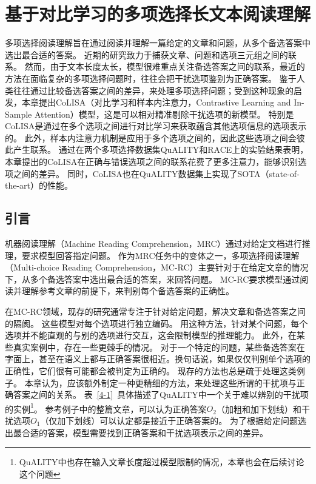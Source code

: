 \chapter{基于对比学习的多项选择长文本阅读理解}
多项选择阅读理解旨在通过阅读并理解一篇给定的文章和问题，从多个备选答案中选出最合适的答案。
近期的研究致力于捕获文章、问题和选项三元组之间的联系。
然而，由于文本长度太长，模型很难重点关注备选答案之间的联系，最近的方法在面临复杂的多项选择问题时，往往会把干扰选项鉴别为正确答案。
鉴于人类往往通过比较备选答案之间的差异，来处理多项选择问题；受到这种现象的启发，本章提出CoLISA（对比学习和样本内注意力，Contrastive Learning and In-Sample Attention）模型，这是可以相对精准剔除干扰选项的新模型。
特别是CoLISA是通过在多个选项之间进行对比学习来获取蕴含其他选项信息的选项表示的。
此外，样本内注意力机制是应用于多个选项之间的，因此这些选项之间会彼此产生联系。
通过在两个多项选择数据集QuALITY和RACE上的实验结果表明，本章提出的CoLISA在正确与错误选项之间的联系花费了更多注意力，能够识别选项之间的差异。
同时，CoLISA也在QuALITY数据集上实现了SOTA（state-of-the-art）的性能。


\section{引言}
机器阅读理解（Machine Reading Comprehension，MRC）通过对给定文档进行推理，要求模型回答指定问题。
作为MRC任务中的变体之一，多项选择阅读理解\cite{richardson2013mctest}（Multi-choice Reading Comprehension，MC-RC）主要针对于在给定文章的情况下，从多个备选答案中选出最合适的答案，来回答问题。
MC-RC要求模型通过阅读并理解参考文章的前提下，来判别每个备选答案的正确性。

在MC-RC领域，现存的研究通常专注于针对给定问题，解决文章和备选答案之间的隔阂\cite{ran2019option,zhang2020dcmn+}。
这些模型对每个选项进行独立编码。
用这种方法，针对某个问题，每个选项并不能直观的与别的选项进行交互，这会限制模型的推理能力。
此外，在某些真实案例中，存在一些更棘手的情况。
对于一个特定的问题，某些备选答案在字面上，甚至在语义上都与正确答案很相近。换句话说，如果仅仅判别单个选项的正确性，它们很有可能都会被判定为正确的。
现存的方法也总是疏于处理这类例子。
本章认为，应该额外制定一种更精细的方法，来处理这些所谓的干扰项与正确答案之间的关系。
表~\ref{4-1}~具体描述了QuALITY\cite{pang2021quality}中一个关于难以辨别的干扰项的实例\footnote{QuALITY中也存在输入文章长度超过模型限制的情况，本章也会在后续讨论这个问题}。
参考例子中的整篇文章，可以认为正确答案$O_2$（加粗和加下划线）和干扰选项$O_1$（仅加下划线）可以认定都是接近于正确答案的。
为了根据给定问题选出最合适的答案，模型需要找到正确答案和干扰选项表示之间的差异。


